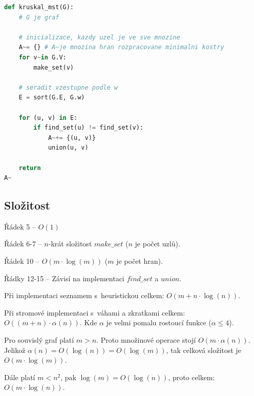 \bigskip\noindent\begin{minipage}{\linewidth}
\begin{lstlisting}[language=Python, caption={Kruskalův algoritmus. Funkce \texttt{make\_set(v)} vytvoří množinu obsahující $v$, \texttt{find\_set(v)} vrátí reprezentanta množiny ve které se nachází $v$, \texttt{union(u, v)} sjednotí dvě množiny obsahující $u$ a $v$.}]
def kruskal_mst(G):
    # G je graf

    # inicializace, kazdy uzel je ve sve mnozine
    A~= {} # A~je mnozina hran rozpracovane minimalni kostry
    for v~in G.V:
        make_set(v)

    # seradit vzestupne podle w
    E = sort(G.E, G.w)

    for (u, v) in E:
        if find_set(u) != find_set(v):
            A~+= {(u, v)}
            union(u, v)

    return
A~\end{lstlisting}
\end{minipage}

\subsection*{Složitost}

\begin{compactitem}
    \item Řádek 5 -- $O(1)$
    \item Řádek 6-7 -- $n$-krát složitost $make\_set$ ($n$ je počet uzlů).
    \item Řádek 10 -- $O(m \cdot \log(m))$ ($m$ je počet hran).
    \item Řádky 12-15 -- Závisí na implementaci $find\_set$ a $union$.
    \begin{compactitem}
        \item Při implementaci seznamem s~heuristickou celkem: $O(m + n \cdot \log(n))$.
        \item Při stromové implementaci s~váhami a zkratkami celkem: $O((m+n) \cdot \alpha(n))$. Kde $\alpha$ je velmi pomalu rostoucí funkce ($\alpha \leq 4$).
    \end{compactitem}
    \item Pro souvislý graf platí $m > n$. Proto množinové operace stojí $O(m \cdot \alpha(n))$. Jelikož $\alpha(n) = O(\log(n)) = O(\log(m))$, tak celková složitost je $O(m \cdot \log(m))$.
    \item Dále platí $m < n^2$, pak $\log(m) = O(\log(n))$, proto celkem: $O(m \cdot \log(n))$.
\end{compactitem}

